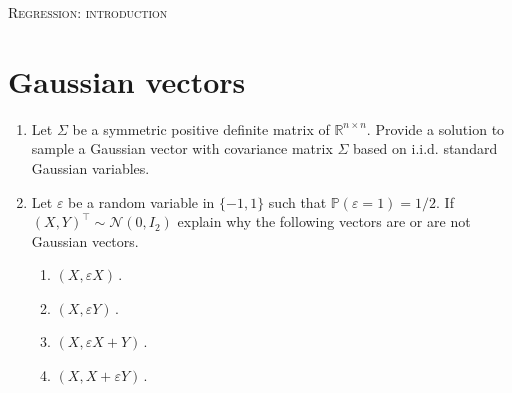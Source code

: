 \documentclass[a4paper,10pt,fleqn]{article}
\newcommand{\eqsp}{\,}
\newcommand{\rset}{\ensuremath{\mathbb{R}}}
\newcommand{\bP}{\mathbb{P}}
\newcommand{\X}{\ensuremath{\mathcal{X}}}
\newcommand{\1}{\ensuremath{\mathbbm{1}}}
\begin{document}

\noindent\hrulefill

\begin{center}
\textsc{Regression: introduction}
\end{center}
\hrulefill

\medskip


\section{Gaussian vectors}
\begin{enumerate}
\item Let $\Sigma$ be a symmetric positive definite matrix of $\rset^{n\times n}$. Provide a solution to sample a Gaussian vector with covariance matrix $\Sigma$ based on i.i.d. standard Gaussian variables.

%

\item Let $\varepsilon$ be a random variable in $\{-1,1\}$ such that $\bP(\varepsilon = 1) = 1/2$. If $(X,Y)^\top\sim \mathcal{N}(0,I_2)$ explain why the following vectors are or are not Gaussian vectors.
\begin{enumerate}
\item $(X,\varepsilon X)$\eqsp.

\item $(X,\varepsilon Y)$\eqsp.

\item $(X,\varepsilon X + Y)$\eqsp.

\item $(X,X + \varepsilon Y)$\eqsp.

\end{enumerate}



\end{enumerate}
\end{document}
